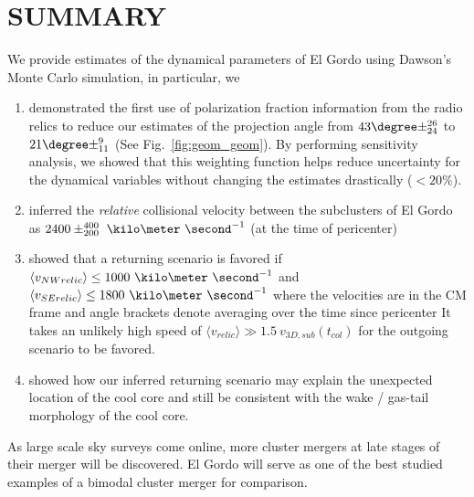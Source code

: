 \section{SUMMARY} 
We provide estimates of the dynamical parameters of El Gordo using Dawson's
Monte Carlo simulation, in particular, we 
\begin{enumerate}
	\item demonstrated the first use of polarization fraction information from
		the radio relics to reduce our estimates of the projection angle from
		$43\degree \pm ^{26}_{24}$ to $21 \degree \pm^{9}_{11}$ (See
		Fig.~\ref{fig:geom_geom}). By performing sensitivity analysis, we
		showed that this weighting function helps reduce uncertainty for the dynamical
		variables without changing the estimates drastically ($< 20\%$).\\ 
	\item inferred the {\it relative} collisional velocity 
		between the subclusters of El Gordo as 
		$2400\pm^{400}_{200}~\kilo\meter~\second^{-1}$  
		(at the time of pericenter)
	\item showed that a returning scenario is favored if $\langle v_{NW relic}\rangle \leq
		1000~\kilo
		\meter~\second^{-1}$ and $\langle v_{SE relic}\rangle \leq
		1800~\kilo\meter~\second^{-1}$
where the velocities are in the CM frame and angle brackets denote averaging over the time since pericenter
		It takes
		an unlikely high speed of $\langle v_{relic} \rangle \gg 1.5~v_{3D,
		sub}(t_{col})$ for the outgoing scenario to be favored. \\ 
	\item showed how our inferred
		returning scenario may explain the unexpected location of the cool
		core and still be consistent with the wake / gas-tail morphology of the cool core. 
\end{enumerate}
As large scale sky surveys come online, more cluster mergers at late
stages of their merger will be discovered. El Gordo will serve as one of
the best studied examples of a bimodal cluster merger for comparison.  
